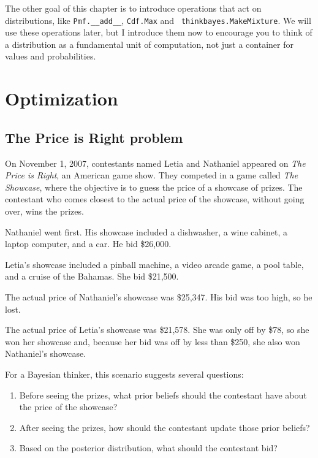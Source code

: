 \documentclass[12pt]{book}
\begin{document}
The other goal of this chapter is to introduce operations that act on
distributions, like \verb"Pmf.__add__", {\tt Cdf.Max} and {\tt
  thinkbayes.MakeMixture}.  We will use these operations later, but I
introduce them now to encourage you to think of a distribution as a
fundamental unit of computation, not just a container for values and
probabilities.



\chapter{Optimization}
\label{optimization}

\section{The Price is Right problem}

On November 1, 2007, contestants named Letia and Nathaniel appeared
on {\it The Price is Right}, an American game show.  They competed in
a game called {\it The Showcase}, where the objective is to guess the price
of a showcase of prizes.  The contestant who comes closest to the
actual price of the showcase, without going over, wins the prizes.

Nathaniel went first.  His showcase included a dishwasher, a wine
cabinet, a laptop computer, and a car.  He bid \$26,000.

Letia's showcase included a pinball machine, a video arcade game, a
pool table, and a cruise of the Bahamas.  She bid \$21,500.

The actual price of Nathaniel's showcase was \$25,347.  His bid
was too high, so he lost.

The actual price of Letia's showcase was \$21,578.  She was only
off by \$78, so she won her showcase and, because
her bid was off by less than \$250, she also won Nathaniel's
showcase.

For a Bayesian thinker, this scenario suggests several questions:

\begin{enumerate}

\item Before seeing the prizes, what prior beliefs should the
  contestant have about the price of the showcase?

\item After seeing the prizes, how should the contestant update
  those prior beliefs?

\item Based on the posterior distribution, what should the
  contestant bid?

\end{enumerate}
\end{document}
